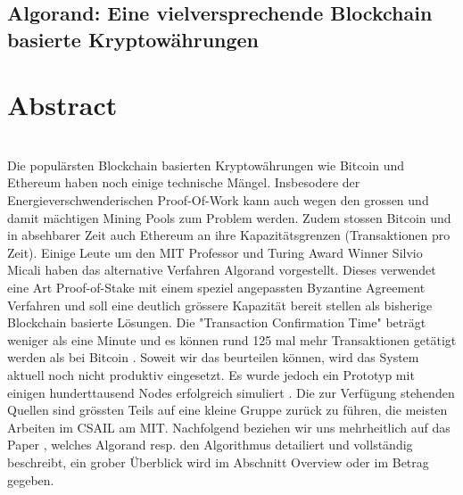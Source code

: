 \documentclass[11pt,a4paper]{article}
\author{Heinz Hofmann und Jonas Schmid}
\begin{document}
\section*{ \center \textbf{\LARGE Algorand: Eine vielversprechende Blockchain basierte Kryptow\"ahrungen}}
\chapter{\textbf{\Large Abstract }}\\
Die popul\"arsten Blockchain basierten Kryptow\"ahrungen wie Bitcoin und Ethereum haben noch einige technische M\"angel.
Insbesodere der Energieverschwenderischen Proof-Of-Work kann auch wegen den grossen 
und damit m\"achtigen Mining Pools zum Problem werden.
Zudem stossen Bitcoin und in absehbarer Zeit auch Ethereum an ihre Kapazit\"atsgrenzen (Transaktionen pro Zeit).
Einige Leute um den MIT Professor und Turing Award Winner Silvio Micali haben das alternative Verfahren Algorand vorgestellt.
Dieses verwendet eine Art Proof-of-Stake mit einem speziel angepassten Byzantine Agreement Verfahren und soll eine deutlich gr\"ossere Kapazit\"at bereit stellen als bisherige Blockchain basierte L\"osungen.
Die "Transaction Confirmation Time" betr\"agt weniger als eine Minute und es k\"onnen rund 125 mal mehr Transaktionen get\"atigt werden als bei Bitcoin \cite[Introduction]{Gilad:2017:ASB:3132747.3132757}.
Soweit wir das beurteilen k\"onnen, wird das System aktuell noch nicht produktiv eingesetzt.
Es wurde jedoch ein Prototyp mit einigen hunderttausend Nodes erfolgreich simuliert \cite[Kapitel Implementation \& Evaluation]{Gilad:2017:ASB:3132747.3132757}.
Die zur Verf\"ugung stehenden Quellen sind gr\"ossten Teils auf eine kleine Gruppe zur\"uck zu f\"uhren,
die meisten Arbeiten im CSAIL am MIT. %
Nachfolgend beziehen wir uns mehrheitlich auf das Paper \cite{Gilad:2017:ASB:3132747.3132757}, welches Algorand resp. den Algorithmus detailiert und vollst\"andig beschreibt, ein grober \"Uberblick wird im Abschnitt Overview oder im Betrag \cite{ScalingConsensus} gegeben.
\end{document}
